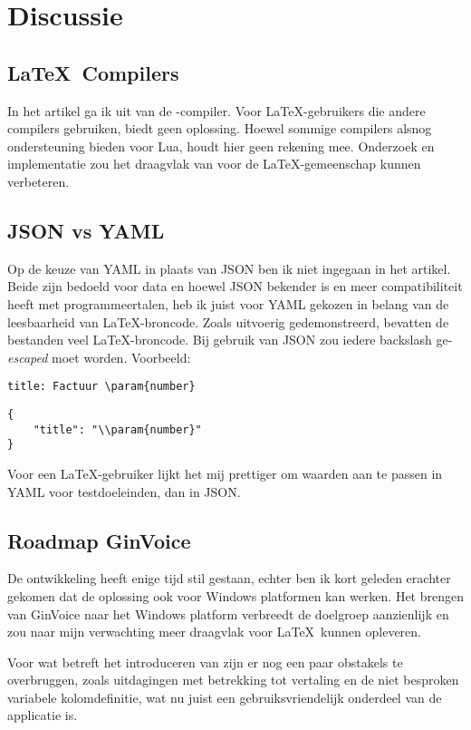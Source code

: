 \section{Discussie}

\subsection{\LaTeX\ Compilers}
In het artikel ga ik uit van de \LuaLaTeX-compiler.
Voor \LaTeX-gebruikers die andere compilers gebruiken, biedt  geen oplossing.
Hoewel sommige compilers alsnog ondersteuning bieden voor Lua, houdt  hier geen rekening mee.
Onderzoek en implementatie zou het draagvlak van  voor de \LaTeX-gemeenschap kunnen verbeteren.

\subsection{JSON vs YAML}
Op de keuze van YAML in plaats van JSON ben ik niet ingegaan in het artikel. Beide zijn bedoeld voor data en
hoewel JSON bekender is en meer compatibiliteit heeft met programmeertalen, heb ik juist voor YAML gekozen in belang van de leesbaarheid van \LaTeX-broncode.
Zoals uitvoerig gedemonstreerd, bevatten de bestanden veel \LaTeX-broncode.
Bij gebruik van JSON zou iedere backslash ge-\textit{escaped} moet worden.
Voorbeeld:
\begin{lstlisting}[style=yaml,caption={YAML-voorbeeld}]
title: Factuur \param{number}
\end{lstlisting}
\begin{lstlisting}[style=json,caption={JSON-voorbeeld}]
{
    "title": "\\param{number}"
}
\end{lstlisting}
Voor een \LaTeX-gebruiker lijkt het mij prettiger om waarden aan te passen in YAML voor testdoeleinden, dan in JSON\@.

\subsection{Roadmap GinVoice}
De ontwikkeling heeft enige tijd stil gestaan, echter ben ik kort geleden erachter gekomen dat de oplossing ook voor Windows platformen kan werken.
Het brengen van GinVoice naar het Windows platform verbreedt de doelgroep aanzienlijk en zou naar mijn verwachting meer draagvlak voor \LaTeX\ kunnen opleveren.

Voor wat betreft het introduceren van  zijn er nog een paar obstakels te overbruggen, zoals uitdagingen met betrekking tot vertaling en de niet besproken variabele kolomdefinitie, wat nu juist een gebruiksvriendelijk onderdeel van de applicatie is.
